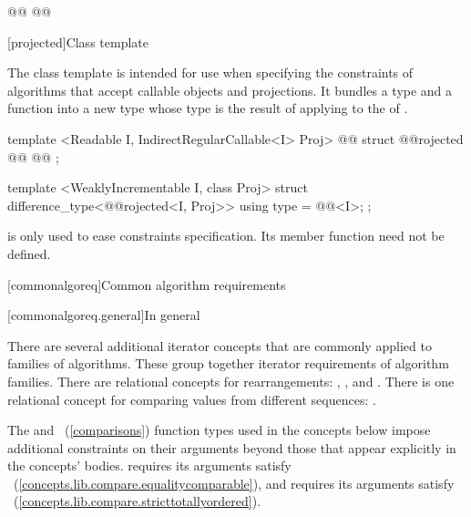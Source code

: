 \begin{addedblock}
\begin{codeblock}
  @@
  @@
\end{codeblock}

[projected]{Class template }

\pnum
The  class template is intended for use when specifying the constraints of
algorithms that accept callable objects and projections. It bundles a  type
 and a function  into a new  type whose
 type is the result of applying  to the
 of .

%
\begin{codeblock}
  template <Readable I, IndirectRegularCallable<I> Proj>
    @@
  struct @@rojected {
    @@
    @@
  };

  template <WeaklyIncrementable I, class Proj>
  struct difference_type<@@rojected<I, Proj>> {
    using type = @@<I>;
  };
\end{codeblock}

\pnum
\enternote {} is only used to ease constraints specification. Its
member function need not be defined.\exitnote

[commonalgoreq]{Common algorithm requirements}

[commonalgoreq.general]{In general}

\pnum
There are several additional iterator concepts that are commonly applied to families of algorithms.
These group together iterator requirements of algorithm families.  There are  relational concepts
for rearrangements: , , and .
There is one relational concept for comparing values from different sequences: .

{\color{newclr}
\pnum
\enternote The  and ~(\ref{comparisons}) function types used in the
concepts below impose additional constraints on their arguments beyond those that appear explicitly in the
concepts' bodies.  requires its arguments satisfy ~(\ref{concepts.lib.compare.equalitycomparable}),
and  requires its arguments satisfy ~(\ref{concepts.lib.compare.stricttotallyordered}).\exitnote
}


\end{addedblock}
